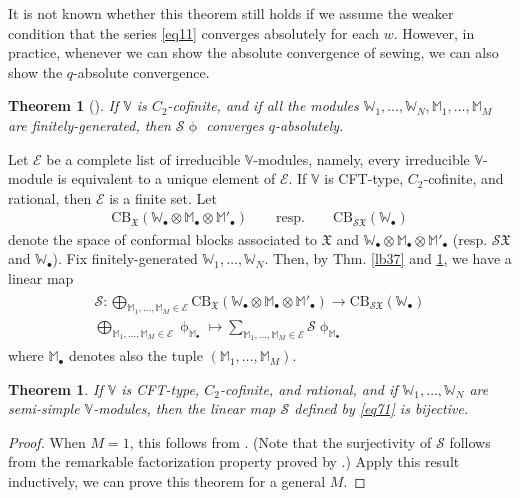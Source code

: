 \documentclass[12pt,a4paper,notitlepage]{article}
\theoremstyle{definition}
\theoremstyle{plain}
\newtheorem{thm}[df]{Theorem}
\newcommand{\fk}{\mathfrak}
\newcommand{\mc}{\mathcal}
\newcommand{\scr}{\mathscr}
\newcommand{\blt}{\bullet}
\newcommand{\Vbb}{\mathbb V}
\newcommand{\Wbb}{\mathbb W}
\newcommand{\Mbb}{\mathbb M}
\newcommand{\CB}{\mathrm{CB}}
\numberwithin{equation}{subsection}
\begin{document}
It is not known whether this theorem still holds if we assume the weaker condition that the series \eqref{eq11} converges absolutely for each $w$. However, in practice, whenever we can show the absolute convergence of sewing, we can also show the $q$-absolute convergence.



\begin{thm}[{\cite[Thm. 13.1]{Gui20b}}]\label{lb39}
If $\Vbb$ is $C_2$-cofinite, and if all the modules $\Wbb_1,\dots,\Wbb_N,\Mbb_1,\dots,\Mbb_M$ are finitely-generated, then $\scr S\upphi$ converges $q$-absolutely.
\end{thm}





Let $\mc E$ be a complete list of irreducible $\Vbb$-modules, namely, every irreducible $\Vbb$-module is equivalent to a unique element of $\mc E$. If $\Vbb$ is CFT-type, $C_2$-cofinite, and rational, then $\mc E$ is a finite set. Let
\begin{align*}
\CB_{\fk X}(\Wbb_\blt\otimes\Mbb_\blt\otimes\Mbb'_\blt)\qquad\text{resp.}\qquad \CB_{\scr S\fk X}(\Wbb_\blt)	
\end{align*}
denote the space of conformal blocks associated to $\fk X$ and $\Wbb_\blt\otimes\Mbb_\blt\otimes\Mbb'_\blt$ (resp. $\scr S\fk X$ and $\Wbb_\blt$). Fix finitely-generated $\Wbb_1,\dots,\Wbb_N$. Then,  by Thm. \ref{lb37} and \ref{lb39}, we have a linear map
\begin{gather}
\begin{array}{c}
\scr S:\bigoplus_{\Mbb_1,\dots,\Mbb_M\in\mc E}\CB_{\fk X}(\Wbb_\blt\otimes\Mbb_\blt\otimes\Mbb'_\blt)\rightarrow\CB_{\scr S\fk X}(\Wbb_\blt)	\\[0.8ex]
\bigoplus_{\Mbb_1,\dots,\Mbb_M\in\mc E}\upphi_{\Mbb_\blt}\mapsto\sum _{\Mbb_1,\dots,\Mbb_M\in\mc E}\scr S\upphi_{\Mbb_\blt}
\end{array}	\label{eq71}
\end{gather}
where $\Mbb_\blt$ denotes also the tuple $(\Mbb_1,\dots,\Mbb_M)$.



\begin{thm}\label{lb40}
If $\Vbb$ is CFT-type, $C_2$-cofinite, and rational, and if $\Wbb_1,\dots,\Wbb_N$ are semi-simple $\Vbb$-modules, then the linear map $\scr S$ defined by \eqref{eq71} is bijective.
\end{thm}


\begin{proof}
When $M=1$, this follows from \cite[Thm. 12.1]{Gui20b}. (Note that the surjectivity of $\scr S$ follows from the remarkable factorization property proved by \cite{DGT19b}.) Apply this result inductively, we can prove this theorem for a general $M$.
\end{proof}
\end{document}
